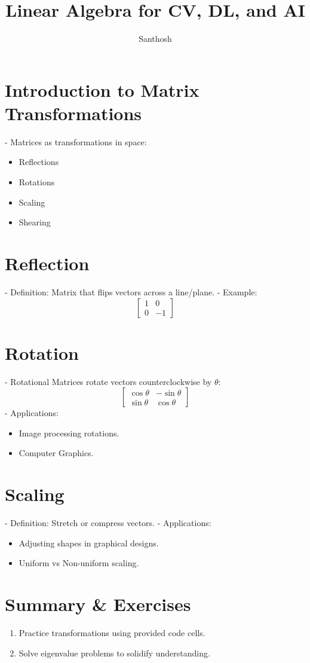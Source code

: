 \documentclass{article}
\title{Linear Algebra for CV, DL, and AI}
\author{Santhosh}
\date{}
\begin{document}
\maketitle

\section*{Introduction to Matrix Transformations}
- Matrices as transformations in space:
\begin{itemize}
	\item Reflections
	\item Rotations
	\item Scaling
	\item Shearing
\end{itemize}

\section*{Reflection}
- Definition: Matrix that flips vectors across a line/plane.
- Example:
\[
	\begin{bmatrix}
		1 & 0  \\
		0 & -1
	\end{bmatrix}
\]

\section*{Rotation}
- Rotational Matrices rotate vectors counterclockwise by $\theta$:
\[
	\begin{bmatrix}
		\cos{\theta} & -\sin{\theta} \\
		\sin{\theta} & \cos{\theta}
	\end{bmatrix}
\]
- Applications:
\begin{itemize}
	\item Image processing rotations.
	\item Computer Graphics.
\end{itemize}

\section*{Scaling}
- Definition: Stretch or compress vectors.
- Applications:
\begin{itemize}
	\item Adjusting shapes in graphical designs.
	\item Uniform vs Non-uniform scaling.
\end{itemize}

\section*{Summary \& Exercises}
\begin{enumerate}
	\item Practice transformations using provided code cells.
	\item Solve eigenvalue problems to solidify understanding.
\end{enumerate}
\end{document}
